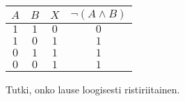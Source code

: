 \begin{tehtavasivu}
\begin{tehtava}
    \begin{vastaus}
    \begin{center}
\begin{tabular}{|c|c|c|c|}\hline
$A$ & $B$ & $X$ & $\lnot(A\land B)$\\ \hline
$1$ & $1$ & $0$ & $0$\\
$1$ & $0$ & $1$ & $1$\\
$0$ & $1$ & $1$ & $1$\\
$0$ & $0$ & $1$ & $1$\\ \hline
\end{tabular}
\end{center}

    \end{vastaus}
    
\end{tehtava}

\begin{tehtava}
     Tutki, onko lause loogisesti ristiriitainen.

    \begin{vastaus}
    

\end{vastaus}
\end{tehtava}
\end{tehtavasivu}
